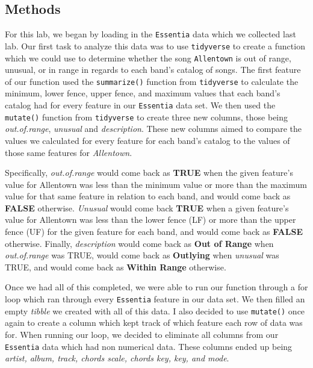 \documentclass{article}\usepackage[]{graphicx}\usepackage[]{xcolor}
\begin{document}
\begin{multicols}{2}
\section{Methods}
For this lab, we began by loading in the \texttt{Essentia} \citep{Essentia} data which we collected last lab. Our first task to analyze this data was to use \texttt{tidyverse} to create a function which we could use to determine whether the song \texttt{Allentown} is out of range, unusual, or in range in regards to each band's catalog of songs. The first feature of our function used the \texttt{summarize()} function from \texttt{tidyverse} to calculate the minimum, lower fence, upper fence, and maximum values that each band's catalog had for every feature in our \texttt{Essentia} data set. We then used the \texttt{mutate()} function from \texttt{tidyverse} to create three new columns, those being \textit{out.of.range}, \textit{unusual} and \textit{description}. These new columns aimed to compare the values we calculated for every feature for each band's catalog to the values of those same features for \textit{Allentown}. 
\par\indent
Specifically, \textit{out.of.range} would come back as \textbf{TRUE} when the given feature's value for Allentown was less than the minimum value or more than the maximum value for that same feature in relation to each band, and would come back as \textbf{FALSE} otherwise. \textit{Unusual} would come back \textbf{TRUE} when a given feature's value for Allentown was less than the lower fence (LF) or more than the upper fence (UF) for the given feature for each band, and would come back as \textbf{FALSE} otherwise. Finally, \textit{description} would come back as \textbf{Out of Range} when \textit{out.of.range} was TRUE, would come back as \textbf{Outlying} when \textit{unusual} was TRUE, and would come back as \textbf{Within Range} otherwise.
\par\indent
Once we had all of this completed, we were able to run our function through a for loop which ran through every \texttt{Essentia} feature in our data set. We then filled an empty \textit{tibble} we created with all of this data. I also decided to use \texttt{mutate()} once again to create a column which kept track of which feature each row of data was for. When running our loop, we decided to eliminate all columns from our \texttt{Essentia} data which had non numerical data. These columns ended up being \textit{artist, album, track, chords scale, chords key, key, and mode}.
\par\indent

\end{multicols}
\end{document}
